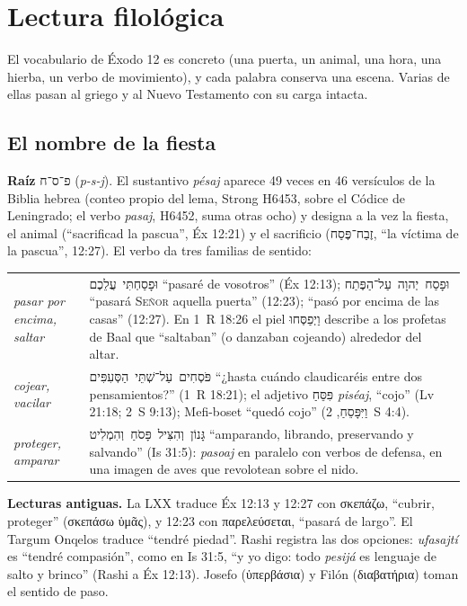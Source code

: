 \documentclass[11pt,letterpaper]{article}
\newcommand{\heb}[1]{\mbox{\foreignlanguage{hebrew}{#1}}}
\newcommand{\grc}[1]{\foreignlanguage{ancientgreek}{#1}}
\newcommand{\SENOR}{\textsc{Señor}}
\begin{document}
\section{Lectura filológica}

El vocabulario de Éxodo 12 es concreto (una puerta, un animal, una hora, una hierba, un verbo de movimiento), y cada palabra conserva una escena. Varias de ellas pasan al griego y al Nuevo Testamento con su carga intacta.

\subsection{El nombre de la fiesta}

\begin{filologia}[\heb{פֶּסַח} \emph{pésaj}]
\textbf{Raíz} \heb{פ־ס־ח} (\emph{p-s-j}). El sustantivo \emph{pésaj} aparece 49 veces en 46 versículos de la Biblia hebrea (conteo propio del lema, Strong H6453, sobre el Códice de Leningrado; el verbo \emph{pasaj}, H6452, suma otras ocho) y designa a la vez la fiesta, el animal (``sacrificad la pascua'', Éx 12:21) y el sacrificio (\heb{זֶבַח־פֶּסַח}, ``la víctima de la pascua'', 12:27). El verbo da tres familias de sentido:\par\smallskip
\begin{tabular}{@{}L{3.4cm}L{11.0cm}@{}}
\emph{pasar por encima, saltar} & \heb{וּפָסַחְתִּי עֲלֵכֶם} ``pasaré de vosotros'' (Éx 12:13); \heb{וּפָסַח יְהוָה עַל־הַפֶּתַח} ``pasará \SENOR{} aquella puerta'' (12:23); ``pasó por encima de las casas'' (12:27). En 1~R 18:26 el piel \heb{וַיְפַסְּחוּ} describe a los profetas de Baal que ``saltaban'' (o danzaban cojeando) alrededor del altar. \\[2pt]
\emph{cojear, vacilar} & \heb{פֹּסְחִים עַל־שְׁתֵּי הַסְּעִפִּים} ``¿hasta cuándo claudicaréis entre dos pensamientos?'' (1~R 18:21); el adjetivo \heb{פִּסֵּחַ} \emph{piséaj}, ``cojo'' (Lv 21:18; 2~S 9:13); Mefi-boset ``quedó cojo'' (\heb{וַיִּפָּסֵחַ}, 2~S 4:4). \\[2pt]
\emph{proteger, amparar} & \heb{גָּנוֹן וְהִצִּיל פָּסֹחַ וְהִמְלִיט} ``amparando, librando, preservando y salvando'' (Is 31:5): \emph{pasoaj} en paralelo con verbos de defensa, en una imagen de aves que revolotean sobre el nido. \\
\end{tabular}\par\smallskip
\textbf{Lecturas antiguas.} La LXX traduce Éx 12:13 y 12:27 con \grc{σκεπάζω}, ``cubrir, proteger'' (\grc{σκεπάσω ὑμᾶς}), y 12:23 con \grc{παρελεύσεται}, ``pasará de largo''. El Targum Onqelos traduce ``tendré piedad''. Rashi registra las dos opciones: \emph{ufasajtí} es ``tendré compasión'', como en Is 31:5, ``y yo digo: todo \emph{pesijá} es lenguaje de salto y brinco'' (Rashi a Éx 12:13). Josefo (\grc{ὑπερβάσια}) y Filón (\grc{διαβατήρια}) toman el sentido de paso.
\end{filologia}
\end{document}

